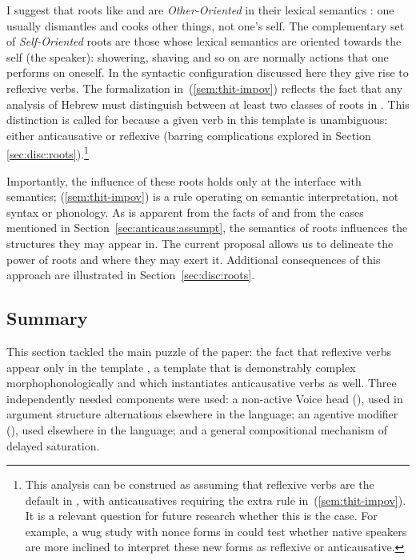 I suggest that roots like  and  are \emph{Other-Oriented} in their lexical semantics \citep{schaefer12,alexiadouafto,spathasetal15}: one usually dismantles and cooks other things, not one's self. The complementary set of \emph{Self-Oriented} roots are those whose lexical semantics are oriented towards the self (the speaker): showering, shaving and so on are normally actions that one performs on oneself. In the syntactic configuration discussed here they give rise to reflexive verbs. The formalization in~(\ref{sem:thit-impov}) reflects the fact that any analysis of Hebrew must distinguish between at least two classes of roots in {\thit}. This distinction is called for because a given verb in this template is unambiguous: either anticausative or reflexive (barring complications explored in Section \ref{sec:disc:roots}).\footnote{This analysis can be construed as assuming that reflexive verbs are the default in {\thit}, with anticausatives requiring the extra rule in~(\ref{sem:thit-impov}). It is a relevant question for future research whether this is the case. For example, a wug study with nonce forms in {\thit} could test whether native speakers are more inclined to interpret these new forms as reflexive or anticausative.}

Importantly, the influence of these roots holds only at the interface with semantics; (\ref{sem:thit-impov}) is a rule operating on semantic interpretation, not syntax or phonology. As is apparent from the facts of {\thit} and from the cases mentioned in Section~\ref{sec:anticaus:assumpt}, the semantics of roots influences the structures they may appear in. The current proposal allows us to delineate the power of roots and where they may exert it. Additional consequences of this approach are illustrated in Section~\ref{sec:disc:roots}.

	\subsection{Summary}
This section tackled the main puzzle of the paper: the fact that reflexive verbs appear only in the template {\thit}, a template that is demonstrably complex morphophonologically and which instantiates anticausative verbs as well. Three independently needed components were used: a non-active Voice head (\vz), used in argument structure alternations elsewhere in the language; an agentive modifier (\va), used elsewhere in the language; and a general compositional mechanism of delayed saturation.

